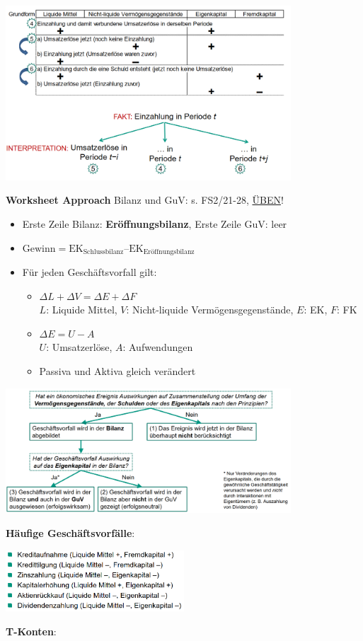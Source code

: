 \begin{center}
	\includegraphics[width=0.8\textwidth]{images/gf2.png}
\end{center}

\textbf{Worksheet Approach} Bilanz und GuV: s. FS2/21-28, \underline{ÜBEN}!
\begin{itemize}
	\item Erste Zeile Bilanz: \textbf{Eröffnungsbilanz}, Erste Zeile GuV: leer
	\item $\text{Gewinn}=\text{EK}_\text{Schlussbilanz}–\text{EK}_\text{Eröffnungsbilanz}$
	\item Für jeden Geschäftsvorfall gilt:
	\begin{itemize}
		\item $\Delta L + \Delta V=\Delta E+\Delta F$ \\
		$L$: Liquide Mittel, $V$: Nicht-liquide Vermögensgegenstände, $E$: EK, $F$: FK
		\item $\Delta E=U-A$\\
		$U$: Umsatzerlöse, $A$: Aufwendungen
		\item Passiva und Aktiva gleich verändert
	\end{itemize}
\end{itemize}
\begin{center}
	\includegraphics[width=0.8\textwidth]{images/sze.png}
\end{center}
\textbf{Häufige Geschäftsvorfälle}:
\begin{center}
	\includegraphics[width=0.5\textwidth]{images/gsv.png}
\end{center}
\bigskip

\textbf{T-Konten}: